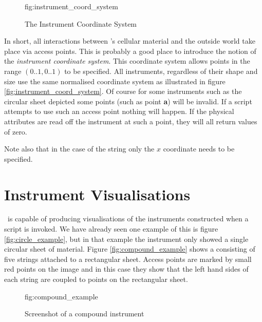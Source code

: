\begin{figure}[htb]
  \begin{Label}{fig:instrument_coord_system}
    \begin{center}
    \end{center}
    \caption{The Instrument Coordinate System}
  \end{Label}
\end{figure}

In short, all interactions between \tao's cellular material and the outside
world take place via access points. This is probably a good place to 
introduce the notion of the
\emph{instrument coordinate system}.
This coordinate system allows points in the range $(0..1, 0..1)$ to be
specified.
All instruments, regardless of their shape and size use the same 
normalised coordinate system as illustrated in figure
\ref{fig:instrument_coord_system}. Of course for some instruments
such as the circular sheet depicted some points (such as point \textbf{a})
will be invalid. If a script attempts to use such an access point
nothing will happen. If the physical attributes are read off
the instrument at such a point, they will all return values of zero.

Note also that in the case of the string only the $x$ coordinate needs
to be specified.

\section{Instrument Visualisations}
\label{instrument_visualisations}
\tao\ is capable of producing visualisations of the instruments constructed
when a script is invoked. We have already seen one example of this is figure
\ref{fig:circle_example}, but in that example the instrument only showed a 
single circular sheet of material. Figure \ref{fig:compound_example} shows a
 consisting of five strings attached to a
rectangular sheet. Access points are marked by small red points on the image
and in this case they show that the left hand sides of each string are
coupled to points on the rectangular sheet.

\begin{figure}[htb]
  \begin{Label}{fig:compound_example}
    \begin{center}
    \end{center}
    \caption{Screenshot of a compound instrument}
  \end{Label}
\end{figure}

